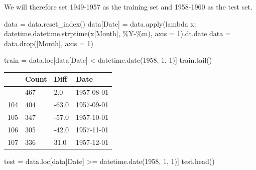 \documentclass[
  letterpaper,
  DIV=11,
  numbers=noendperiod]{scrartcl}
\newenvironment{Shaded}{\begin{snugshade}}{\end{snugshade}}
\newcommand{\BuiltInTok}[1]{\textcolor[rgb]{0.00,0.23,0.31}{#1}}
\newcommand{\DecValTok}[1]{\textcolor[rgb]{0.68,0.00,0.00}{#1}}
\newcommand{\KeywordTok}[1]{\textcolor[rgb]{0.00,0.23,0.31}{#1}}
\newcommand{\NormalTok}[1]{\textcolor[rgb]{0.00,0.23,0.31}{#1}}
\newcommand{\OperatorTok}[1]{\textcolor[rgb]{0.37,0.37,0.37}{#1}}
\newcommand{\StringTok}[1]{\textcolor[rgb]{0.13,0.47,0.30}{#1}}
\begin{document}
We will therefore set 1949-1957 as the training set and 1958-1960 as the
test set.

\begin{Shaded}
\begin{Highlighting}[]
\NormalTok{data }\OperatorTok{=}\NormalTok{ data.reset\_index()}
\NormalTok{data[}\StringTok{\textquotesingle{}Date\textquotesingle{}}\NormalTok{] }\OperatorTok{=}\NormalTok{ data.}\BuiltInTok{apply}\NormalTok{(}\KeywordTok{lambda}\NormalTok{ x: datetime.datetime.strptime(x[}\StringTok{\textquotesingle{}Month\textquotesingle{}}\NormalTok{], }\StringTok{\textquotesingle{}\%Y{-}\%m\textquotesingle{}}\NormalTok{), axis }\OperatorTok{=} \DecValTok{1}\NormalTok{).dt.date}
\NormalTok{data }\OperatorTok{=}\NormalTok{ data.drop([}\StringTok{\textquotesingle{}Month\textquotesingle{}}\NormalTok{], axis }\OperatorTok{=} \DecValTok{1}\NormalTok{)}
\end{Highlighting}
\end{Shaded}

\begin{Shaded}
\begin{Highlighting}[]
\NormalTok{train }\OperatorTok{=}\NormalTok{ data.loc[data[}\StringTok{\textquotesingle{}Date\textquotesingle{}}\NormalTok{] }\OperatorTok{\textless{}}\NormalTok{ datetime.date(}\DecValTok{1958}\NormalTok{, }\DecValTok{1}\NormalTok{, }\DecValTok{1}\NormalTok{)]}
\NormalTok{train.tail()}
\end{Highlighting}
\end{Shaded}

\begin{longtable}[]{@{}llll@{}}
\toprule\noalign{}
& Count & Diff & Date \\
\midrule\noalign{}
\endhead
\bottomrule\noalign{}
\endlastfoot
103 & 467 & 2.0 & 1957-08-01 \\
104 & 404 & -63.0 & 1957-09-01 \\
105 & 347 & -57.0 & 1957-10-01 \\
106 & 305 & -42.0 & 1957-11-01 \\
107 & 336 & 31.0 & 1957-12-01 \\
\end{longtable}

\begin{Shaded}
\begin{Highlighting}[]
\NormalTok{test }\OperatorTok{=}\NormalTok{ data.loc[data[}\StringTok{\textquotesingle{}Date\textquotesingle{}}\NormalTok{] }\OperatorTok{\textgreater{}=}\NormalTok{ datetime.date(}\DecValTok{1958}\NormalTok{, }\DecValTok{1}\NormalTok{, }\DecValTok{1}\NormalTok{)]}
\NormalTok{test.head()}
\end{Highlighting}
\end{Shaded}
\end{document}

